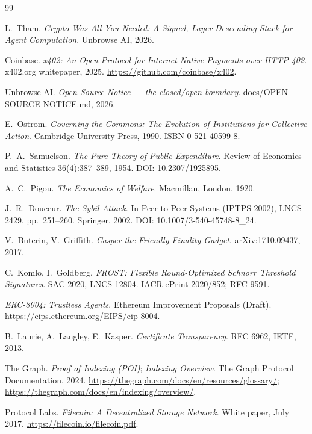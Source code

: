 \documentclass[11pt]{article}
\begin{document}
\begin{thebibliography}{99}

 L.~Tham. \emph{Crypto Was All You Needed: A
Signed, Layer-Descending Stack for Agent Computation}. Unbrowse AI, 2026.

 Coinbase. \emph{x402: An Open Protocol for Internet-Native Payments
over HTTP 402}. x402.org whitepaper, 2025. \url{https://github.com/coinbase/x402}.

 Unbrowse AI. \emph{Open Source Notice --- the closed/open
boundary}. docs/OPEN-SOURCE-NOTICE.md, 2026.

 E.~Ostrom. \emph{Governing the Commons: The Evolution of
Institutions for Collective Action}. Cambridge University Press, 1990. ISBN
0-521-40599-8.

 P.~A.~Samuelson. \emph{The Pure Theory of Public Expenditure}.
Review of Economics and Statistics 36(4):387--389, 1954. DOI: 10.2307/1925895.

 A.~C.~Pigou. \emph{The Economics of Welfare}. Macmillan, London,
1920.

 J.~R.~Douceur. \emph{The Sybil Attack}. In Peer-to-Peer Systems
(IPTPS 2002), LNCS 2429, pp.~251--260. Springer, 2002. DOI:
10.1007/3-540-45748-8\_24.

 V.~Buterin, V.~Griffith. \emph{Casper the Friendly Finality
Gadget}. arXiv:1710.09437, 2017.

 C.~Komlo, I.~Goldberg. \emph{FROST: Flexible Round-Optimized Schnorr
Threshold Signatures}. SAC 2020, LNCS 12804. IACR ePrint 2020/852; RFC 9591.

 \emph{ERC-8004: Trustless Agents}. Ethereum Improvement Proposals
(Draft). \url{https://eips.ethereum.org/EIPS/eip-8004}.

 B.~Laurie, A.~Langley, E.~Kasper. \emph{Certificate Transparency}.
RFC 6962, IETF, 2013.

 The Graph. \emph{Proof of Indexing (POI)}; \emph{Indexing
Overview}. The Graph Protocol Documentation, 2024.
\url{https://thegraph.com/docs/en/resources/glossary/};
\url{https://thegraph.com/docs/en/indexing/overview/}.

 Protocol Labs. \emph{Filecoin: A Decentralized Storage
Network}. White paper, July 2017. \url{https://filecoin.io/filecoin.pdf}.
\end{thebibliography}
\end{document}
